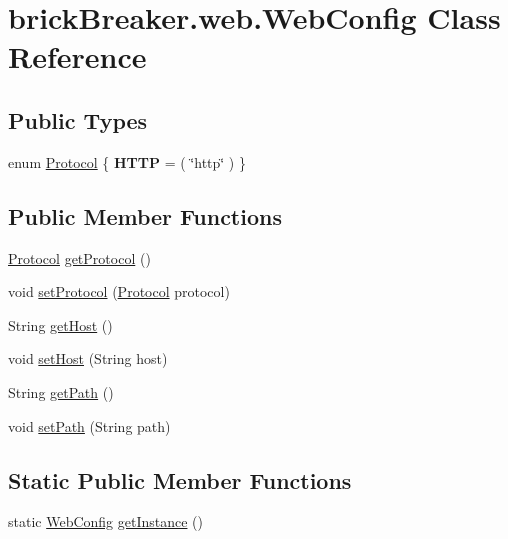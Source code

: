\hypertarget{classbrick_breaker_1_1web_1_1_web_config}{
\section{brickBreaker.web.WebConfig Class Reference}
\label{classbrick_breaker_1_1web_1_1_web_config}
}
\subsection*{Public Types}
\begin{DoxyCompactItemize}
\item 
enum \hyperlink{classbrick_breaker_1_1web_1_1_web_config_a67fb01568cd83c5fa0685d95df6ca638}{Protocol} \{ {\bfseries HTTP} = ( \char`\"{}http\char`\"{} )
 \}
\end{DoxyCompactItemize}
\subsection*{Public Member Functions}
\begin{DoxyCompactItemize}
\item 
\hyperlink{classbrick_breaker_1_1web_1_1_web_config_a67fb01568cd83c5fa0685d95df6ca638}{Protocol} \hyperlink{classbrick_breaker_1_1web_1_1_web_config_a3718624e9a8e0cb7d4321cbadc716fae}{getProtocol} ()
\item 
void \hyperlink{classbrick_breaker_1_1web_1_1_web_config_acc5392f5644d6ca1a30736ca776a24eb}{setProtocol} (\hyperlink{classbrick_breaker_1_1web_1_1_web_config_a67fb01568cd83c5fa0685d95df6ca638}{Protocol} protocol)
\item 
String \hyperlink{classbrick_breaker_1_1web_1_1_web_config_a0face1c0ade730029ff6389b5a610112}{getHost} ()
\item 
void \hyperlink{classbrick_breaker_1_1web_1_1_web_config_a9746602db48181b7228b39c85bb7b34e}{setHost} (String host)
\item 
String \hyperlink{classbrick_breaker_1_1web_1_1_web_config_a2c7cb30ccc2b83bceada6faccc4f37fc}{getPath} ()
\item 
void \hyperlink{classbrick_breaker_1_1web_1_1_web_config_a3f4efd872b5cc690c9511a4d2e49ee89}{setPath} (String path)
\end{DoxyCompactItemize}
\subsection*{Static Public Member Functions}
\begin{DoxyCompactItemize}
\item 
static \hyperlink{classbrick_breaker_1_1web_1_1_web_config}{WebConfig} \hyperlink{classbrick_breaker_1_1web_1_1_web_config_aea2e81e51a4834d9d0bbc1705d7c4bfc}{getInstance} ()
\end{DoxyCompactItemize}



